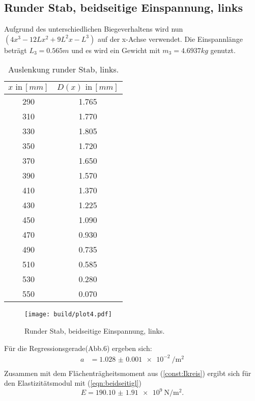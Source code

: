 \subsection{Runder Stab, beidseitige Einspannung, links}
Aufgrund des unterschiedlichen Biegeverhaltens wird nun $\left(4x^3-12Lx^2+9L^2x-L^3\right)$
auf der x-Achse verwendet. Die Einspannlänge beträgt $L_3 = 0.565m$
und es wird ein Gewicht mit $m_3 = 4.6937 kg$ genutzt.

\begin{table}[h]
  \centering
  \label{tab:lit5}
  \begin{tabular}{ c c  }
    \toprule
    $x \,\, \text{in} \, [mm]$
   &{$D(x) \,\, \text{in} \, [mm]$}\\

    \midrule
    290 & 1.765 \\
    310 & 1.770 \\
    330 & 1.805 \\
    350 & 1.720 \\
    370 & 1.650 \\
    390 & 1.570 \\
    410 & 1.370 \\
    430 & 1.225 \\
    450 & 1.090 \\
    470 & 0.930 \\
    490 & 0.735 \\
    510 & 0.585 \\
    530 & 0.280 \\
    550 & 0.070 \\


    \bottomrule
  \end{tabular}
  \caption{Auslenkung runder Stab, links.}
\end{table}

\begin{figure}
  \centering
  \texttt{[image: build/plot4.pdf]}
  \caption{Runder Stab, beidseitige Einspannung, links.}
  \label{fig:plot4}
\end{figure}
Für die Regressionsgerade(Abb.6) ergeben sich:
\begin{align*}
  a &= \SI{1.028(1)e-2}{\per\square\meter} \\
\end{align*}
Zusammen mit dem Flächenträgheitsmoment aus (\ref{const:Ikreis})
ergibt sich für den Elastizitätsmodul mit (\ref{eqn:beidseitigl})
\begin{equation*}
  E = \SI{190.10(191)e9}{\newton\per\square\meter} .
\end{equation*}
\newpage
